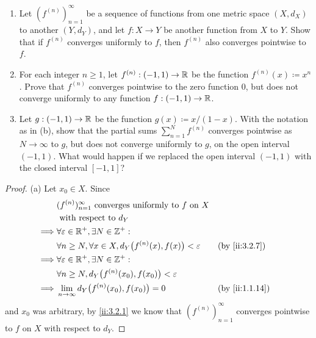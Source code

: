 \begin{ex}\label{ii:ex:3.2.2}
  \quad
  \begin{enumerate}
    \item Let \((f^{(n)})_{n = 1}^\infty\) be a sequence of functions from one metric space \((X, d_X)\) to another \((Y, d_Y)\), and let \(f : X \to Y\) be another function from \(X\) to \(Y\).
          Show that if \(f^{(n)}\) converges uniformly to \(f\), then \(f^{(n)}\) also converges pointwise to \(f\).
    \item For each integer \(n \geq 1\), let \(f^{(n)} : (-1, 1) \to \mathbb{R}\) be the function \(f^{(n)}(x) \coloneqq x^n\).
          Prove that \(f^{(n)}\) converges pointwise to the zero function \(0\), but does not converge uniformly to any function \(f : (-1, 1) \to \mathbb{R}\).
    \item Let \(g : (-1, 1) \to \mathbb{R}\) be the function \(g(x) \coloneqq x / (1 - x)\).
          With the notation as in (b), show that the partial sums \(\sum_{n = 1}^N f^{(n)}\) converges pointwise as \(N \to \infty\) to \(g\), but does not converge uniformly to \(g\), on the open interval \((-1, 1)\).
          What would happen if we replaced the open interval \((-1, 1)\) with the closed interval \([-1, 1]\)?
  \end{enumerate}
\end{ex}

\begin{proof}{(a)}
  Let \(x_0 \in X\).
  Since
  \begin{align*}
             & (f^{(n)})_{n = 1}^\infty \text{ converges uniformly to } f \text{ on } X                           \\
             & \text{ with respect to } d_Y                                                                       \\
    \implies & \forall \varepsilon \in \R^+, \exists N \in \Z^+ :                                                 \\
             & \forall n \geq N, \forall x \in X, d_Y\big(f^{(n)}(x), f(x)\big) < \varepsilon &  & \by{ii:3.2.7}  \\
    \implies & \forall \varepsilon \in \R^+, \exists N \in \Z^+ :                                                 \\
             & \forall n \geq N, d_Y\big(f^{(n)}(x_0), f(x_0)\big) < \varepsilon                                  \\
    \implies & \lim_{n \to \infty} d_Y\big(f^{(n)}(x_0), f(x_0)\big) = 0                      &  & \by{ii:1.1.14}
  \end{align*}
  and \(x_0\) was arbitrary, by \cref{ii:3.2.1} we know that \((f^{(n)})_{n = 1}^\infty\) converges pointwise to \(f\) on \(X\) with respect to \(d_Y\).
\end{proof}

